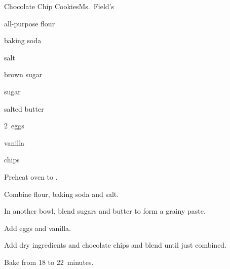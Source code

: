 \begin{recipe}{Chocolate Chip Cookies}{Ms.~Field's}{}

\begin{ingredients}
\item \C{2\half} all-purpose flour
\item \tp{\half} baking soda
\item \tp{\quarter} salt
\item {} brown sugar
\item \C{\half} sugar
\item {} salted butter
\item 2~eggs
\item {} vanilla
\item {}  chips
\end{ingredients}

\begin{directions}
\item Preheat oven to .
\item Combine flour, baking soda and salt.
\item In another bowl, blend sugars and butter to form a grainy paste.
\item Add eggs and vanilla.
\item Add dry ingredients and chocolate chips and blend until just combined.
\item Bake from 18 to 22~minutes.
\end{directions}
\end{recipe}
